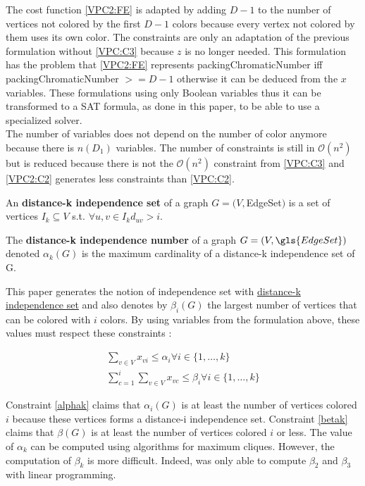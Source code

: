 The cost function \ref{VPC2:FE} is adapted by adding  $D-1$ to the number of vertices not colored by the first $D-1$ colors because every vertex not colored by them uses its own color. The constraints are only an adaptation of the previous formulation without \ref{VPC:C3} because $z$ is no longer needed. This formulation has the problem that \ref{VPC2:FE} represents \gls{packingChromaticNumber} iff \gls{packingChromaticNumber} $ >= D-1$ otherwise it can be deduced from the $x$ variables. These formulations using only Boolean variables thus it can be transformed to a SAT formula, as done in this paper, to be able to use a specialized solver.\\
The number of variables does not depend on the number of color anymore because there is $n(D_1)$ variables. The number of constraints is still in $\mathcal{O}(n^2)$ but is reduced because there is not the $\mathcal{O}(n^2)$ constraint from \ref{VPC:C3} and \ref{VPC2:C2} generates less constraints than \ref{VPC:C2}.\\

\begin{mydef}
\label{def:kIS}
An \textbf{distance-k independence set} of a graph $G=(V,$\gls{EdgeSet}$)$ is a set of vertices $I_k \subseteq V$ s.t. $\forall u,v \in I_k d_{uv} > i$.
\end{mydef}

\begin{mydef}
\label{def:kIN}
The \textbf{distance-k independence number} of a graph $G=(V,\gls{EdgeSet})$ denoted $\alpha_k(G)$ is the maximum cardinality of a distance-k independence set of G.
\end{mydef}

This paper generates the notion of independence set with \hyperref[def:kIS]{distance-k independence set} and also denotes by $\beta_i(G)$ the largest number of vertices that can be colored with $i$ colors. By using variables from the formulation above, these values must respect these constraints  :

\begin{eqnarray}
\sum_{v \in V} x_{vi} \leq \alpha_i \forall i \in \{1,\dots,k\}  \label{alphak} \\
\sum_{c = 1}^{i} \sum_{v \in V} x_{vc} \leq \beta_i \forall i \in \{1,\dots,k\} \label{betak}
\end{eqnarray}

Constraint \ref{alphak} claims that $\alpha_i(G)$ is at least the number of vertices colored $i$ because these vertices forms a distance-i independence set. Constraint \ref{betak} claims that $\beta(G)$ is at least the number of vertices colored $i$ or less. The value of $\alpha_k$ can be computed using algorithms for maximum cliques. However, the computation of $\beta_k$ is more difficult. Indeed, \cite{PCModel} was only able to compute $\beta_2$ and $\beta_3$ with linear programming.

